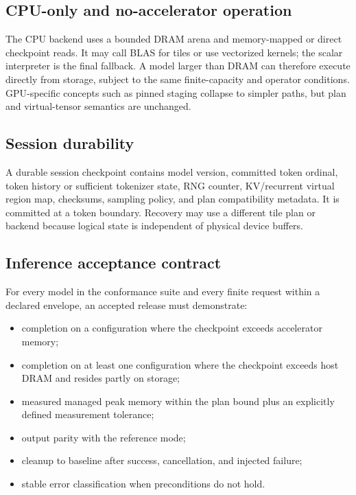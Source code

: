 \subsection{CPU-only and no-accelerator operation}

The CPU backend uses a bounded DRAM arena and memory-mapped or direct checkpoint reads. It may call BLAS for tiles or use vectorized kernels; the scalar interpreter is the final fallback. A model larger than DRAM can therefore execute directly from storage, subject to the same finite-capacity and operator conditions. GPU-specific concepts such as pinned staging collapse to simpler paths, but plan and virtual-tensor semantics are unchanged.

\subsection{Session durability}

A durable session checkpoint contains model version, committed token ordinal, token history or sufficient tokenizer state, RNG counter, KV/recurrent virtual region map, checksums, sampling policy, and plan compatibility metadata. It is committed at a token boundary. Recovery may use a different tile plan or backend because logical state is independent of physical device buffers.

\subsection{Inference acceptance contract}

For every model in the conformance suite and every finite request within a declared envelope, an accepted release must demonstrate:

\begin{itemize}
  \item completion on a configuration where the checkpoint exceeds accelerator memory;
  \item completion on at least one configuration where the checkpoint exceeds host DRAM and resides partly on storage;
  \item measured managed peak memory within the plan bound plus an explicitly defined measurement tolerance;
  \item output parity with the reference mode;
  \item cleanup to baseline after success, cancellation, and injected failure;
  \item stable error classification when preconditions do not hold.
\end{itemize}
